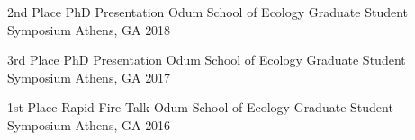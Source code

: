 



\begin{cvhonors}
\cvhonor
  {2nd Place PhD Presentation}
  {Odum School of Ecology Graduate Student Symposium}
  {Athens, GA}
  {2018}

  \cvhonor
    {3rd Place PhD Presentation}
    {Odum School of Ecology Graduate Student Symposium}
    {Athens, GA}
    {2017}

  \cvhonor
    {1st Place Rapid Fire Talk} %
    {Odum School of Ecology Graduate Student Symposium} %
    {Athens, GA} %
    {2016} %

\end{cvhonors}

\medskip

